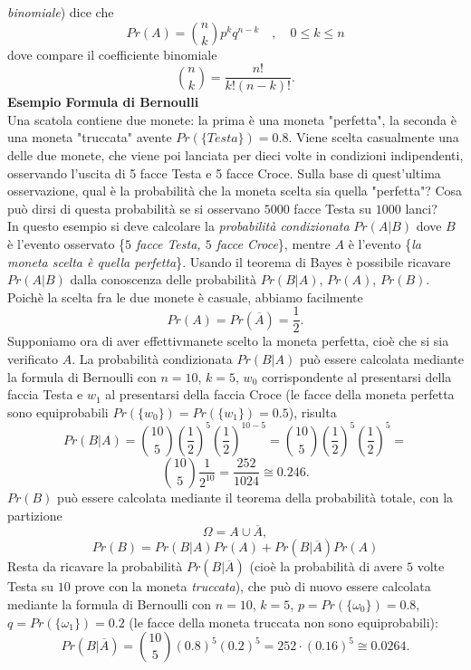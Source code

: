 \documentclass[12pt,oneside,openany]{memoir}
\numberwithin{equation}{subsection}
\begin{document}
\textit{binomiale}) dice che
\[
    Pr(A) = {n \choose k} p^k q^{n - k} \quad , \quad 0 \leq k \leq n
\]
dove compare il coefficiente binomiale
\[
    {n \choose k} = \frac{n!}{k! (n - k)!}.
\]
\bigbreak
\noindent
\textbf{Esempio Formula di Bernoulli}\\
Una scatola contiene due monete: la prima \`e una moneta "perfetta", la seconda
\`e una moneta "truccata" avente $Pr(\{Testa\}) = 0.8$. Viene scelta casualmente
una delle due monete, che viene poi lanciata per dieci volte in condizioni
indipendenti, osservando l'uscita di 5 facce Testa e 5 facce Croce. Sulla base
di quest'ultima osservazione, qual \`e la probabilit\`a che la moneta scelta sia
quella "perfetta"? Cosa pu\`o dirsi di questa probabilit\`a se si osservano
$5000$ facce Testa su $1000$ lanci?\\
In questo esempio si deve calcolare la \textit{probabilit\`a condizionata}
$Pr(A|B)$ dove $B$ \`e l'evento osservato \{\textit{$5$ facce Testa, $5$ facce
Croce}\}, mentre $A$ \`e l'evento \{\textit{la moneta scelta \`e quella
perfetta}\}. Usando il teorema di Bayes \`e possibile ricavare $Pr(A|B)$ dalla
conoscenza delle probabilit\`a $Pr(B|A)$, $Pr(A)$, $Pr(B)$. Poich\`e la scelta
fra le due monete \`e casuale, abbiamo facilmente
\[
    Pr(A) = Pr(\overline{A}) = \frac{1}{2}.
\]
Supponiamo ora di aver effettivmanete scelto la moneta perfetta, cio\`e che si
sia verificato $A$. La probabilit\`a condizionata $Pr(B|A)$ pu\`o essere
calcolata mediante la formula di Bernoulli con $n = 10$, $k = 5$, $w_0$
corrispondente al presentarsi della faccia Testa e $w_1$ al presentarsi della
faccia Croce (le facce della moneta perfetta sono equiprobabili
$Pr(\{w_0\}) = Pr(\{w_1\}) = 0.5$), risulta
\[
    Pr(B|A) = {10 \choose 5} \left(\frac{1}{2}\right)^5
    \left(\frac{1}{2}\right)^{10 - 5} = {10 \choose 5} \left(
        \frac{1}{2}
    \right)^5
    \left(\frac{1}{2}\right)^5 = 
\]
\[
    {10 \choose 5} \frac{1}{2^{10}} = \frac{252}{1024} \cong 0.246.
\]
$Pr(B)$ pu\`o essere calcolata mediante il teorema della probabilit\`a totale,
con la partizione
\[
    \Omega = A \cup \overline{A},
\]
\[
    Pr(B) = Pr(B|A) Pr(A) + Pr(B|\overline{A}) Pr(A)
\]
Resta da ricavare la probabilit\`a $Pr(B|\overline{A})$ (cio\`e la probabilit\`a
di avere $5$ volte Testa su $10$ prove con la moneta \textit{truccata}), che
pu\`o di nuovo essere calcolata mediante la formula di Bernoulli con $n = 10$,
$k = 5$, $p = Pr(\{\omega_0\}) = 0.8$, $q = Pr(\{\omega_1\}) = 0.2$ (le facce
della moneta truccata non sono equiprobabili):
\[
    Pr(B|\overline{A}) = {10 \choose 5} (0.8)^5 (0.2)^5 = 252 \cdot (0.16)^5
    \cong 0.0264.
\]
\end{document}
